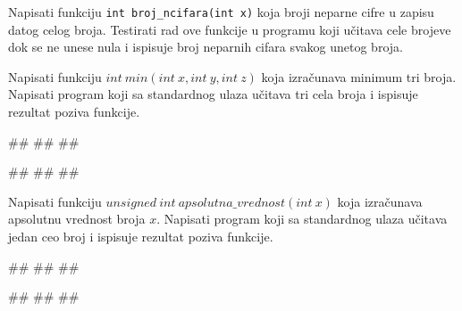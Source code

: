 \begin{Exercise}[label=v1.4_07] 
Napisati funkciju 
\verb|int broj_ncifara(int x)|
koja broji neparne cifre u zapisu datog celog broja. Testirati rad ove funkcije u programu koji učitava cele brojeve dok se ne unese nula i ispisuje
broj neparnih cifara svakog unetog broja. \\ 
\end{Exercise}
\begin{Answer}[ref=v1.4_07]
\end{Answer}



\begin{Exercise}[label=p1.4_01] 
Napisati funkciju $int\ min(int\ x, int\ y, int\ z)$ koja izračunava minimum tri broja. Napisati program koji sa standardnog ulaza učitava tri cela broja i ispisuje rezultat poziva funkcije. 

\begin{miditest}
\begin{upotreba}{1}
#\naslovInt#
##
##
\end{upotreba}
\end{miditest}
\begin{miditest}
\begin{upotreba}{2}
#\naslovInt#
##
##
\end{upotreba}
\end{miditest}
\end{Exercise}
\begin{Answer}[ref=p1.4_01]
\end{Answer}

\begin{Exercise}[label=p1.4_02] 
Napisati funkciju $unsigned\ int\ apsolutna\_vrednost(int\ x)$ koja izračunava apsolutnu vrednost broja $x$. Napisati program koji sa standardnog ulaza učitava jedan ceo broj i ispisuje rezultat poziva funkcije.  

\begin{miditest}
\begin{upotreba}{1}
#\naslovInt#
##
##
\end{upotreba}
\end{miditest}
\begin{miditest}
\begin{upotreba}{2}
#\naslovInt#
##
##
\end{upotreba}
\end{miditest}

\end{Exercise}
\begin{Answer}[ref=p1.4_02]
\end{Answer}


